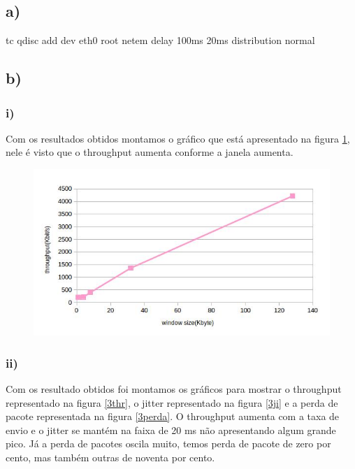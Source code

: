 \documentclass[12pt]{article}
\begin{document}
\subsection{a)}
tc qdisc add dev eth0 root netem delay 100ms 20ms distribution normal
\subsection{b)}
\subsubsection{i)}
Com os resultados obtidos montamos o gráfico que está apresentado na figura \ref{3}, nele é visto que o throughput aumenta conforme a janela aumenta.

\begin{figure}[ht]
\centering
\includegraphics[scale=0.5]{terceiro1.jpg}
\caption{}
\label{3}
\end{figure}
\subsubsection{ii)}
Com os resultado obtidos foi montamos os gráficos para mostrar o throughput representado na figura \ref{3thr}, o jitter representado na figura \ref{3ji} e a perda de pacote representada na figura \ref{3perda}. O throughput aumenta com a taxa de envio e o jitter se mantém na faixa de 20 ms não apresentando algum grande pico. Já a perda de pacotes oscila muito, temos perda de pacote de zero por cento, mas também outras de noventa por cento.
\end{document}
